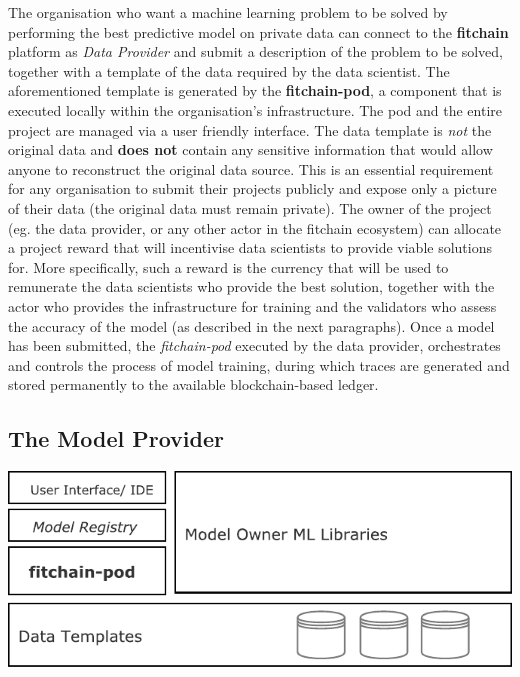 \documentclass[12pt, a4paper,titlepage]{extreport}
\begin{document}
The organisation who want a machine learning problem to be solved by performing the best predictive model on private data can connect to the \textbf{fitchain} platform as \emph{Data Provider} and submit a description of the problem to be solved, together with a template of the data required by the data scientist. The aforementioned template is generated by the \textbf{fitchain-pod}, a component that is executed  locally within the organisation's infrastructure. The pod and the entire project are managed via a user friendly interface. 
The data template is \textit{not} the original data and \textbf{does not} contain any sensitive information that would allow anyone to reconstruct the original data source. This is an essential requirement for any organisation to submit their projects publicly and expose only a picture of their data (the original data must remain private).
The owner of the project (eg. the data provider, or any other actor in the fitchain ecosystem) can allocate a project reward that will incentivise data scientists to provide viable solutions for. More specifically, such a reward is the currency that will be used to remunerate the data scientists who provide the best solution, together with the actor who provides the infrastructure for training and the validators who assess the accuracy of the model (as described in the next paragraphs).
Once a model has been submitted, the \textit{fitchain-pod} executed by the data provider, orchestrates and controls the process of model training, during which traces are generated and stored permanently to the available blockchain-based ledger.

\subsection{The Model Provider}

\begin{center}
\includegraphics[scale=1]{pod_modelowner.pdf} 
\end{center}
\end{document}
